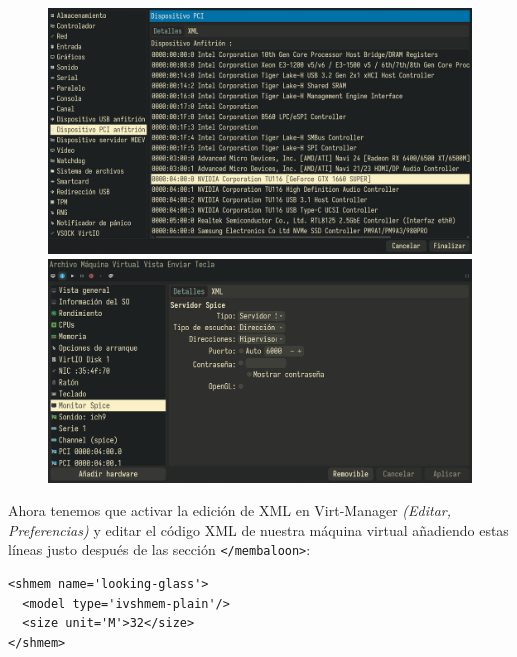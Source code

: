 \documentclass[12pt]{article}
\begin{document}
\begin{figure}[h!]
	\centering
	\begin{minipage}[b]{0.4965\textwidth}
		\includegraphics[height=0.6\textwidth,width=\textwidth]{images/card-add.jpg}
	\end{minipage}
	\begin{minipage}[b]{0.4965\textwidth}
		\includegraphics[height=0.6\textwidth,width=\textwidth]{images/spice-conf.jpg}
	\end{minipage}
\end{figure}

Ahora tenemos que activar la edición de XML en Virt-Manager \emph{(Editar, Preferencias)} y editar el código XML de nuestra máquina virtual añadiendo estas líneas justo después de las sección \texttt{</membaloon>}:

\begin{verbatim}
<shmem name='looking-glass'>
  <model type='ivshmem-plain'/>
  <size unit='M'>32</size>
</shmem>
\end{verbatim}
\end{document}
